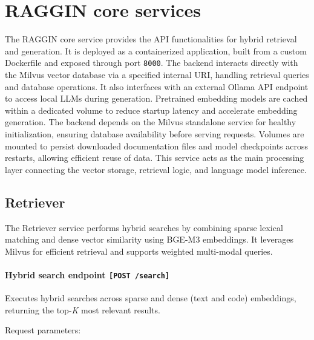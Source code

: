 \section{RAGGIN core services}
\label{sec:raggin-core}

The RAGGIN core service provides the API functionalities for hybrid retrieval and generation. It is deployed as a containerized application, built from a custom Dockerfile and exposed through port \texttt{8000}. The backend interacts directly with the Milvus vector database via a specified internal URI, handling retrieval queries and database operations. It also interfaces with an external Ollama API endpoint to access local LLMs during generation. Pretrained embedding models are cached within a dedicated volume to reduce startup latency and accelerate embedding generation. The backend depends on the Milvus standalone service for healthy initialization, ensuring database availability before serving requests. Volumes are mounted to persist downloaded documentation files and model checkpoints across restarts, allowing efficient reuse of data. This service acts as the main processing layer connecting the vector storage, retrieval logic, and language model inference.

\subsection{Retriever}

The Retriever service performs hybrid searches by combining sparse lexical matching and dense vector similarity using BGE-M3 \cite{chen2024bge} embeddings. It leverages Milvus for efficient retrieval and supports weighted multi-modal queries.

\paragraph*{Hybrid search endpoint \texttt{[POST /search]}}

Executes hybrid searches across sparse and dense (text and code) embeddings, returning the top-\textit{K} most relevant results.

Request parameters:

